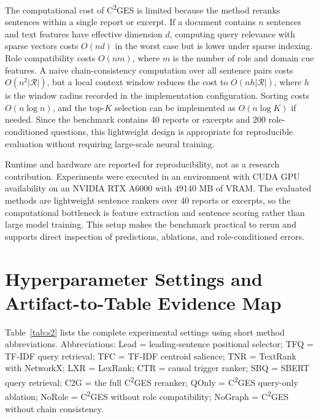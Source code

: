 \documentclass[11pt,letterpaper]{article}
\newcommand{\cges}{C\textsuperscript{2}GES}
\begin{document}
The computational cost of \cges{} is limited because the method reranks sentences within a single report or excerpt. If a document contains $n$ sentences and text features have effective dimension $d$, computing query relevance with sparse vectors costs $O(nd)$ in the worst case but is lower under sparse indexing. Role compatibility costs $O(nm)$, where $m$ is the number of role and domain cue features. A naive chain-consistency computation over all sentence pairs costs $O(n^2|\mathcal{R}|)$, but a local context window reduces the cost to $O(nh|\mathcal{R}|)$, where $h$ is the window radius recorded in the implementation configuration. Sorting costs $O(n\log n)$, and the top-$K$ selection can be implemented as $O(n\log K)$ if needed. Since the benchmark contains 40 reports or excerpts and 200 role-conditioned questions, this lightweight design is appropriate for reproducible evaluation without requiring large-scale neural training.

Runtime and hardware are reported for reproducibility, not as a research contribution. Experiments were executed in an environment with CUDA GPU availability on an NVIDIA RTX A6000 with 49140 MB of VRAM. The evaluated methods are lightweight sentence rankers over 40 reports or excerpts, so the computational bottleneck is feature extraction and sentence scoring rather than large model training. This setup makes the benchmark practical to rerun and supports direct inspection of predictions, ablations, and role-conditioned errors.

\section{Hyperparameter Settings and Artifact-to-Table Evidence Map}
\label{sec:s4}

Table~\ref{tab:s2} lists the complete experimental settings using short method abbreviations. Abbreviations: Lead = leading-sentence positional selector; TFQ = TF-IDF query retrieval; TFC = TF-IDF centroid salience; TNR = TextRank with NetworkX; LXR = LexRank; CTR = causal trigger ranker; SBQ = SBERT query retrieval; C2G = the full \cges{} reranker; QOnly = \cges{} query-only ablation; NoRole = \cges{} without role compatibility; NoGraph = \cges{} without chain consistency.
\end{document}
